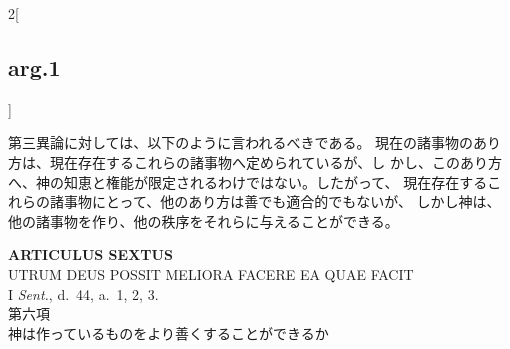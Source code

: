 \documentclass[paper=a4paper,fontsize=10pt,jafontsize=9pt,titlepage]{jlreq}
\begin{document}
\begin{paracol}{2}[\subsection{arg.1}]
\switchcolumn

第三異論に対しては、以下のように言われるべきである。
現在の諸事物のあり方は、現在存在するこれらの諸事物へ定められているが、し
 かし、このあり方へ、神の知恵と権能が限定されるわけではない。したがって、
 現在存在するこれらの諸事物にとって、他のあり方は善でも適合的でもないが、
 しかし神は、他の諸事物を作り、他の秩序をそれらに与えることができる。

\end{paracol}


\newpage
{}
{}
\setcounter{section}{6}
\setcounter{subsection}{0}

\begin{center}
 {\Large {\bfseries ARTICULUS SEXTUS}}\\
 {\large UTRUM DEUS POSSIT MELIORA FACERE EA QUAE FACIT}\\
 {\footnotesize I {\itshape Sent.}, d.~44, a.~1, 2, 3.}\\
 {\Large 第六項\\神は作っているものをより善くすることができるか}
\end{center}
\end{document}
